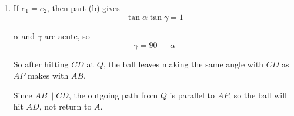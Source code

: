 \documentclass[leqno]{article}
\begin{document}
\begin{enumerate}[
  label=\textbf{\arabic*.},
  leftmargin=*,
  topsep=0pt,
  partopsep=0pt,
  parsep=0pt
]
\begin{djsSolution}
\begin{enumerate}[label=\textbf{(\alph*)}]
  Hence
  \[
  \tan\alpha\tan\gamma > 1
  \]

  From part (b):
  \[
  e_2 = e_1\tan\alpha\tan\gamma
  \]

  Therefore
  \[
  e_2 > e_1
  \]

  So it is possible for the ball to return to $A$ only if $e_2>e_1$.

  \item If $e_1=e_2$, then part (b) gives
  \[
  \tan\alpha\tan\gamma = 1
  \]

  $\alpha$ and $\gamma$ are acute, so
  \[
  \gamma = 90^\circ-\alpha
  \]

  So after hitting $CD$ at $Q$, the ball leaves making the same angle with $CD$ as $AP$ makes with $AB$.

  Since $AB \parallel CD$, the outgoing path from $Q$ is parallel to $AP$, so the ball will hit $AD$, not return to $A$.
\end{enumerate}
\end{djsSolution}


\end{enumerate}
\end{document}
